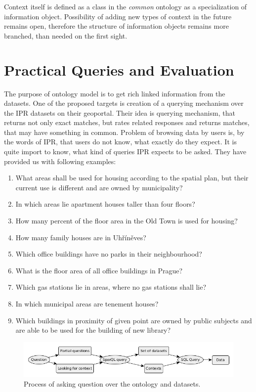 \documentclass{lncs-template/llncs}
\begin{document}
Context itself is defined as a class in the \textit{common} ontology as a specialization of information object. Possibility of adding new types of context in the future remains open, therefore  the structure of information objects remains more branched, than needed on the first sight.

\section{Practical Queries and Evaluation}\label{sec:eval}

The purpose of ontology model is to get rich linked information from the datasets. One of the proposed targets is creation of a querying mechanism over the IPR datasets on their geoportal. Their idea is querying mechanism, that returns not only exact matches, but rates related responses and returns matches, that may have something in common. Problem of browsing data by users is, by the words of IPR, that users do not know, what exactly do they expect. It is quite import to know, what kind of queries IPR expects to be asked. They have provided us with following examples:
\begin{enumerate}
\item What areas shall be used for housing according to the spatial plan, but their current use is different and are owned by municipality?
\item In which areas lie apartment houses taller than four floors?
\item How many percent of the floor area in the Old Town is used for housing?
\item How many family houses are in Uh{\v r}{\' i}n{\v e}ves?
\item Which office buildings have no parks in their neighbourhood?
\item What is the floor area of all office buildings in Prague?
\item Which gas stations lie in areas, where no gas stations shall lie?
\item In which municipal areas are tenement houses?
\item Which buildings in proximity of given point are owned by public subjects and are able to be used for the building of new library?
\end{enumerate}
\begin{figure}
 \includegraphics[width=1.0\textwidth]{images/querying.png}
 \caption{Process of asking question over the ontology and datasets.}\label{fig:querying}
\end{figure}
\end{document}
